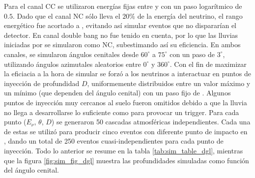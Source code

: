 		Para el canal CC se utilizaron energías fijas entre  y  con un paso logarítmico de $0.5$. 
		Dado que el canal NC sólo lleva el $20\%$ de la energía del neutrino, el rango energético fue acortado a , evitando así simular eventos que no dispararían el detector.
		En canal double bang no fue tenido en cuenta, por lo que las lluvias iniciadas por \nutau{} se simularon como NC, subestimando así su eficiencia.
		En ambos canales, se simularon ángulos cenitales desde $60^\circ$ a $75^\circ$ con un paso de $3^\circ$, utilizando ángulos azimutales aleatorios entre $0^\circ$ y $360^\circ$.
		Con el fin de maximizar la eficiacia a la hora de simular se forzó a los neutrinos a interactuar en puntos de inyección de profundidad $D$, uniformemente distribuidos entre un valor máximo y un mínimo (que dependen del ángulo cenital) con un paso fijo de .
		Algunos puntos de inyección muy cercanos al suelo fueron omitidos debido a que la lluvia no llega a desarrollarse lo suficiente como para provocar un trigger.
		Para cada punto ($E_{\nu}$, $\theta$, $D$) se generaron 50 cascadas atmosféricas independientes.
		Cada una de estas se utilizó para producir cinco eventos con diferente punto de impacto en \Offline{}, dando un total de 250 eventos cuasi-independientes para cada punto de inyección.
		Todo lo anterior se resume en la tabla \ref{tab:sim_table_dgl}, mientras que la figura \ref{fig:sim_fig_dgl} muestra las profundidades simuladas como función del ángulo cenital.
		
